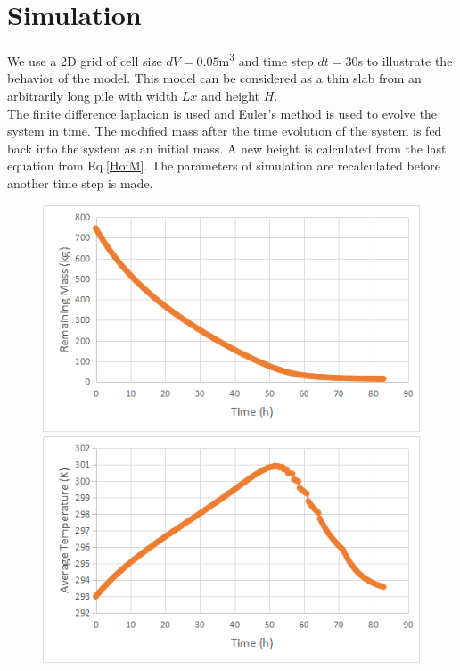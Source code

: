 \documentclass[12pt, letterpaper, titlepage]{article}
\begin{document}
\section{Simulation}
We use a 2D grid of cell size $dV=0.05$\si{\m\cubed} and time step $dt = 30$s to illustrate the behavior of the model. This model can be considered as a thin slab from an arbitrarily long pile with width $Lx$ and height $H$.\\
The finite difference laplacian is used and Euler's method is used to evolve the system in time. The modified mass after the time evolution of the system is fed back into the system as an initial mass. A new height is calculated from the last equation from Eq.\ref{HofM}. The parameters of simulation are recalculated before another time step is made. \\ [5px]
\begin{figure} \label{ long-term-fig} 
  \begin{minipage}[b]{0.5\linewidth}\centering
    \includegraphics[width=1\linewidth]{long-m} 
  \end{minipage} 
  \begin{minipage}[b]{0.5\linewidth}\centering
    \includegraphics[width=1\linewidth]{long-k} 

\end{minipage}
\end{figure}
\end{document}
